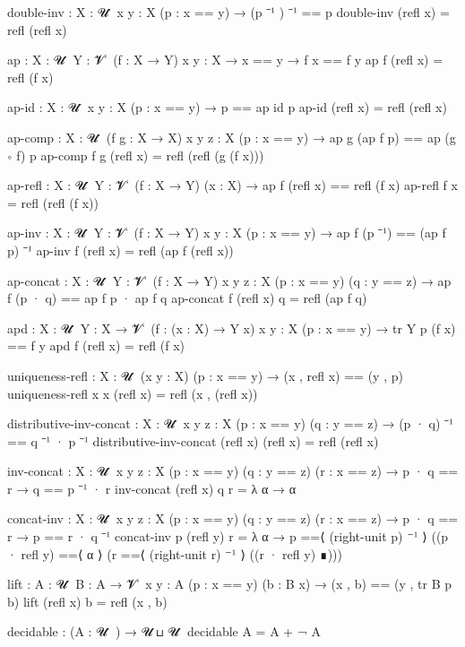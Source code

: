 double-inv : {X : 𝓤 ̇ } {x y : X} (p : x == y)
           → (p ⁻¹ ) ⁻¹ == p
double-inv (refl x) = refl (refl x)
  
ap : {X : 𝓤 ̇ } {Y : 𝓥 ̇ } (f : X → Y) {x y : X} 
   → x == y → f x == f y 
ap f (refl x) = refl (f x)

ap-id : {X : 𝓤 ̇ } {x y : X} (p : x == y) 
      → p == ap id p
ap-id (refl x) = refl (refl x)

ap-comp : {X : 𝓤 ̇ } (f g : X → X) {x y z : X} (p : x == y)
        → ap g (ap f p) == ap (g ∘ f) p
ap-comp f g (refl x) = refl (refl (g (f x)))

ap-refl : {X : 𝓤 ̇ } {Y : 𝓥 ̇ } (f : X → Y) (x : X) 
        → ap f (refl x) == refl (f x)
ap-refl f x = refl (refl (f x))

ap-inv : {X : 𝓤 ̇ } {Y : 𝓥 ̇ } (f : X → Y) {x y : X} (p : x == y) 
       → ap f (p ⁻¹) == (ap f p) ⁻¹
ap-inv f (refl x) = refl (ap f (refl x))

ap-concat : {X : 𝓤 ̇ } {Y : 𝓥 ̇ } (f : X → Y) {x y z : X} (p : x == y) (q : y == z)
          → ap f (p · q) == ap f p · ap f q 
ap-concat f (refl x) q = refl (ap f q)

apd : {X : 𝓤 ̇ } {Y : X → 𝓥 ̇ } (f : (x : X) → Y x) {x y : X} (p : x == y)
    → tr Y p (f x) == f y
apd f (refl x) = refl (f x)

uniqueness-refl : {X : 𝓤 ̇ } (x y : X) (p : x == y) 
                → (x , refl x) == (y , p) 
uniqueness-refl x x (refl x) = refl (x , (refl x))

distributive-inv-concat : {X : 𝓤 ̇ } {x y z : X} (p : x == y) (q : y == z)
                        → (p · q) ⁻¹ == q ⁻¹ · p ⁻¹
distributive-inv-concat (refl x) (refl x) = refl (refl x)

inv-concat : {X : 𝓤 ̇ } {x y z : X} (p : x == y) (q : y == z) (r : x == z)
           → p · q == r → q == p ⁻¹ · r 
inv-concat (refl x) q r = λ α → α

concat-inv : {X : 𝓤 ̇ } {x y z : X} (p : x == y) (q : y == z) (r : x == z)
           → p · q == r → p == r · q ⁻¹
concat-inv p (refl y) r = λ α → p             ==⟨ (right-unit p) ⁻¹ ⟩ 
                                ((p · refl y) ==⟨ α ⟩ 
                                (r            ==⟨ (right-unit r) ⁻¹ ⟩ 
                                ((r · refl y) ∎)))

lift : {A : 𝓤 ̇ } {B : A → 𝓥 ̇ } {x y : A} (p : x == y) (b : B x) 
     → (x , b) == (y , tr B p b)
lift (refl x) b = refl (x , b)

decidable : (A : 𝓤 ̇ ) → 𝓤 ⊔ 𝓤 ̇ 
decidable A = A + ¬ A

